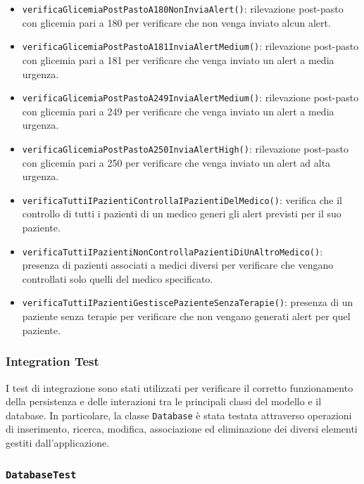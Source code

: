 \begin{itemize}
	\item \texttt{verificaGlicemiaPostPastoA180NonInviaAlert()}: rilevazione post-pasto con glicemia pari a 180 per verificare che non venga inviato alcun alert.
	
	\item \texttt{verificaGlicemiaPostPastoA181InviaAlertMedium()}: rilevazione post-pasto con glicemia pari a 181 per verificare che venga inviato un alert a media urgenza.
	
	\item \texttt{verificaGlicemiaPostPastoA249InviaAlertMedium()}: rilevazione post-pasto con glicemia pari a 249 per verificare che venga inviato un alert a media urgenza.
	
	\item \texttt{verificaGlicemiaPostPastoA250InviaAlertHigh()}: rilevazione post-pasto con glicemia pari a 250 per verificare che venga inviato un alert ad alta urgenza.
	
	\item \texttt{verificaTuttiIPazientiControllaIPazientiDelMedico()}: verifica che il controllo di tutti i pazienti di un medico generi gli alert previsti per il suo paziente.
	
	\item \texttt{verificaTuttiIPazientiNonControllaPazientiDiUnAltroMedico()}: presenza di pazienti associati a medici diversi per verificare che vengano controllati solo quelli del medico specificato.
	
	\item \texttt{verificaTuttiIPazientiGestiscePazienteSenzaTerapie()}: presenza di un paziente senza terapie per verificare che non vengano generati alert per quel paziente.
	
\end{itemize}

\subsubsection{Integration Test}

I test di integrazione sono stati utilizzati per verificare il corretto funzionamento della persistenza e delle interazioni tra le principali classi del modello e il database. In particolare, la classe \texttt{Database} è stata testata attraverso operazioni di inserimento, ricerca, modifica, associazione ed eliminazione dei diversi elementi gestiti dall'applicazione.

\subsubsection*{\texttt{DatabaseTest}}

